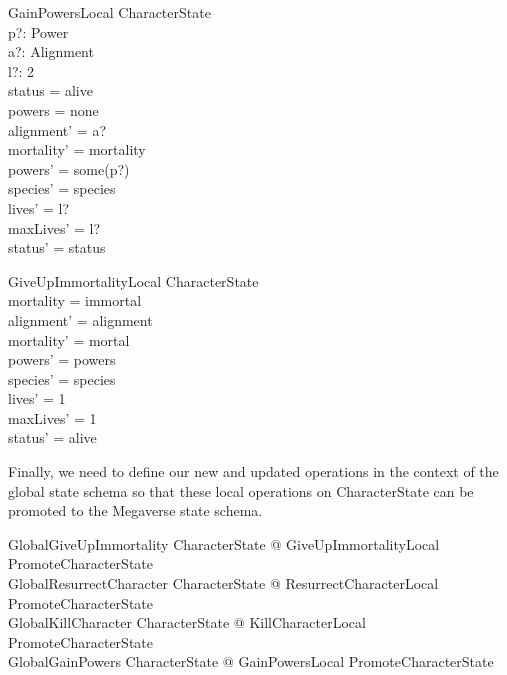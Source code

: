 \documentclass{article}
\begin{document}
\begin{schema}{GainPowersLocal}
\Delta CharacterState \\
p?: Power \\
a?: Alignment \\
l?: 2  \\
\where
status = alive \\ 
powers = none \\
alignment' = a? \\
mortality' = mortality \\
powers' = some(p?) \\ 
species' = species \\
lives' = l? \\
maxLives' = l? \\
status' = status \\
\end{schema}

\begin{schema}{GiveUpImmortalityLocal}
\Delta CharacterState \\
\where
mortality = immortal \\
alignment' = alignment \\
mortality' = mortal \\
powers' = powers \\ 
species' = species \\
lives' = 1 \\
maxLives' = 1 \\
status' = alive \\
\end{schema}

\hspace{-0.64cm} Finally, we need to define our new and updated operations in the context of the global state schema so that these local operations on CharacterState can be promoted to the Megaverse state schema.

\begin{zed}
GlobalGiveUpImmortality  \exists \Delta CharacterState @ GiveUpImmortalityLocal \land PromoteCharacterState \\
GlobalResurrectCharacter  \exists \Delta CharacterState @ ResurrectCharacterLocal \land PromoteCharacterState \\
GlobalKillCharacter  \exists \Delta CharacterState @ KillCharacterLocal \land PromoteCharacterState \\ 
GlobalGainPowers  \exists \Delta CharacterState @ GainPowersLocal \land PromoteCharacterState \\
\end{zed}
\end{document}
